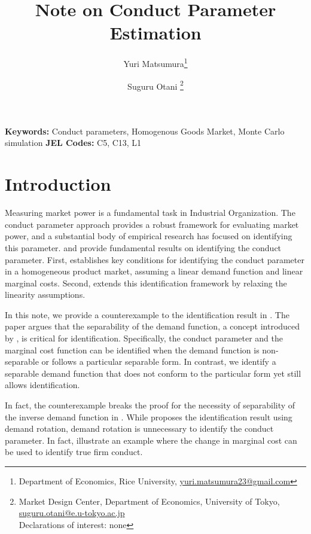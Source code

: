 \documentclass[11pt, a4paper]{article}
\title{Note on Conduct Parameter Estimation}
\author{Yuri Matsumura\thanks{Department of Economics, Rice University, \href{mailto:}{yuri.matsumura23@gmail.com}} \and Suguru Otani \thanks{Market Design Center, Department of Economics, University of Tokyo, \href{mailto:}{suguru.otani@e.u-tokyo.ac.jp}
\\Declarations of interest: none %
}}
\theoremstyle{remark}
\begin{document}
\maketitle

\noindent\textbf{Keywords:} Conduct parameters, Homogenous Goods Market, Monte Carlo simulation
\vspace{0in}
\newline
\noindent\textbf{JEL Codes:} C5, C13, L1

\bigskip


\section{Introduction}

Measuring market power is a fundamental task in Industrial Organization. 
The conduct parameter approach provides a robust framework for evaluating market power, and a substantial body of empirical research has focused on identifying this parameter. 
\cite{bresnahan1982oligopoly} and \citet{lau1982identifying} provide fundamental results on identifying the conduct parameter.
First, \citet{bresnahan1982oligopoly} establishes key conditions for identifying the conduct parameter in a homogeneous product market, assuming a linear demand function and linear marginal costs. 
Second, \citet{lau1982identifying} extends this identification framework by relaxing the linearity assumptions.

In this note, we provide a counterexample to the identification result in \citet{lau1982identifying}. 
The paper argues that the separability of the demand function, a concept introduced by \citet{goldmanNote1964}, is critical for identification. 
Specifically, the conduct parameter and the marginal cost function can be identified when the demand function is non-separable or follows a particular separable form.
In contrast, we identify a separable demand function that does not conform to the particular form yet still allows identification. 


In fact, the counterexample breaks the proof for the necessity of separability of the inverse demand function in \citet{lau1982identifying}.
While \citet{bresnahan1982oligopoly} proposes the identification result using demand rotation, demand rotation is unnecessary to identify the conduct parameter.
In fact, \citet{berry2014identification} illustrate an example where the change in marginal cost can be used to identify true firm conduct.
\end{document}
